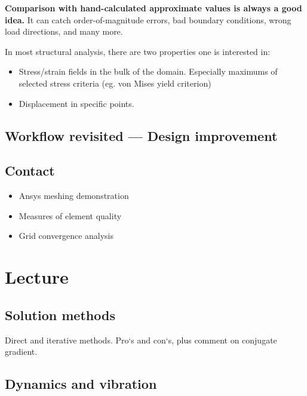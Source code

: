 \documentclass[12pt]{article}
\begin{document}
{\bf Comparison with hand-calculated approximate values is always a good idea.} It can catch order-of-magnitude errors, bad boundary conditions, wrong load directions, and many more.

\begin{center}\end{center}

In most structural analysis, there are two properties one is interested in:
\begin{itemize}
    \item Stress/strain fields in the bulk of the domain. Especially maximums of selected stress criteria (eg. von Mises yield criterion)
    \item Displacement in specific points.
\end{itemize}

\subsection{Workflow revisited --- Design improvement}

\newpage


\subsection*{Contact}
\begin{itemize}
    \item Ansys meshing demonstration
    \item Measures of element quality
    \item Grid convergence analysis
\end{itemize}

\section{Lecture}
\subsection{Solution methods}
Direct and iterative methods. Pro`s and con`s, plus comment on conjugate gradient.
\subsection{Dynamics and vibration}
\end{document}
